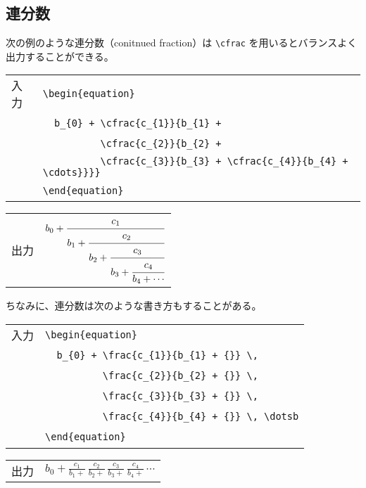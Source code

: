 \subsection{連分数}
次の例のような連分数（conitnued fraction）は \verb`\cfrac` を用いるとバランスよく出力することができる。
\begin{longtable}[l]{@{}l|l@{}}
  入力 & \verb`\begin{equation}`                                                 \\
  \    & \verb`  b_{0} + \cfrac{c_{1}}{b_{1} +`                                  \\
  \    & \verb`          \cfrac{c_{2}}{b_{2} +`                                  \\
  \    & \verb`          \cfrac{c_{3}}{b_{3} + \cfrac{c_{4}}{b_{4} + \cdots}}}}` \\
  \    & \verb`\end{equation}`                                                   \\
\end{longtable}
\begin{longtable}[l]{@{}l|l@{}}
  出力 & $\displaystyle{b_{0} + \cfrac{c_{1}}{b_{1} + \cfrac{c_{2}}{b_{2} + \cfrac{c_{3}}{b_{3} + \cfrac{c_{4}}{b_{4} + \cdots}}}}}$
\end{longtable}
ちなみに、連分数は次のような書き方もすることがある。
\begin{longtable}[l]{@{}l|l@{}}
  入力 & \verb`\begin{equation}`                             \\
  \    & \verb`  b_{0} + \frac{c_{1}}{b_{1} + {}} \,`        \\
  \    & \verb`          \frac{c_{2}}{b_{2} + {}} \,`        \\
  \    & \verb`          \frac{c_{3}}{b_{3} + {}} \,`        \\
  \    & \verb`          \frac{c_{4}}{b_{4} + {}} \, \dotsb` \\
  \    & \verb`\end{equation}`                               \\
\end{longtable}
\begin{longtable}[l]{@{}l|l@{}}
  出力 & $\displaystyle{b_{0} + \frac{c_{1}}{b_{1} + {}} \,\frac{c_{2}}{b_{2} + {}} \,\frac{c_{3}}{b_{3} + {}} \,\frac{c_{4}}{b_{4} + {}} \, \dotsb}$
\end{longtable}
